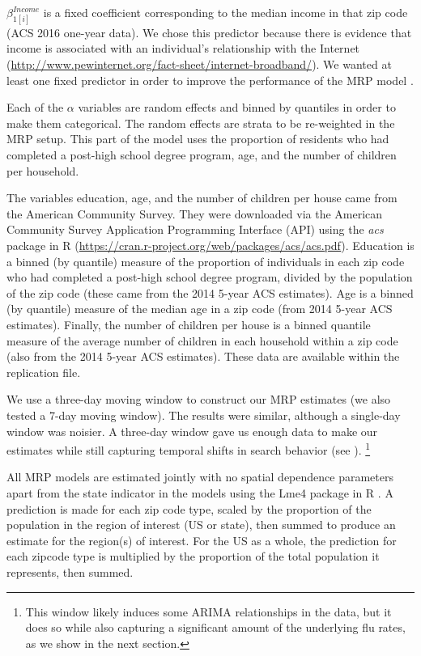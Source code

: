 \documentclass[12pt]{article}
\begin{document}
$\beta_{1[i]}^{Income}$ is a fixed coefficient corresponding to the median income in that zip code (ACS 2016 one-year data). We chose this predictor because there is evidence that income is associated with an individual's relationship with the Internet (\url{http://www.pewinternet.org/fact-sheet/internet-broadband/}). We wanted at least one fixed predictor in order to improve the performance of the MRP model \citep{buttice_and_highton_2013}.

Each of the $\alpha$ variables are random effects and binned by quantiles in order to make them categorical. The random effects are strata to be re-weighted in the MRP setup. This part of the model uses the proportion of residents who had completed a post-high school degree program, age, and the number of children per household.

The variables education, age, and the number of children per house came from the American Community Survey. They were downloaded via the American Community Survey Application Programming Interface (API) using the \emph{acs} package in R (\url{https://cran.r-project.org/web/packages/acs/acs.pdf}). Education is a binned (by quantile) measure of the proportion of individuals in each zip code who had completed a post-high school degree program, divided by the population of the zip code (these came from the 2014 5-year ACS estimates). Age is a binned (by quantile) measure of the median age in a zip code (from 2014 5-year ACS estimates). Finally, the number of children per house is a binned quantile measure of the average number of children in each household within a zip code (also from the 2014 5-year ACS estimates). These data are available within the replication file. 

We use a three-day moving window to construct our MRP estimates (we also tested a 7-day moving window). The results were similar, although a single-day window was noisier. A three-day window gave us enough data to make our estimates while still capturing temporal shifts in search behavior (see \citet{yang_etal_2015inference}). \footnote{This window likely induces some ARIMA relationships in the data, but it does so while also capturing a significant amount of the underlying flu rates, as we show in the next section.} 

All MRP models are estimated jointly with no spatial dependence parameters apart from the state indicator in the models using the Lme4 package in R \citep{bates_etal_2015}. A prediction is made for each zip code type, scaled by the proportion of the population in the region of interest (US or state), then summed to produce an estimate for the region(s) of interest. For the US as a whole, the prediction for each zipcode type is multiplied by the proportion of the total population it represents, then summed. 
\end{document}
